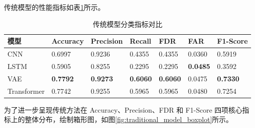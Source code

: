 \documentclass[bachelor, vlined]{DissertUESTC}
\begin{document}
    传统模型的性能指标如表\ref{tab:baseline_metrics}所示。
    
    \begin{table}[!htbp]
      \caption{传统模型分类指标对比}
      \label{tab:baseline_metrics}
      \begin{tabular}{p{2.2cm} p{1.6cm} p{1.6cm} p{1.6cm} p{1.6cm} p{1.6cm} p{1.6cm}}
          \toprule
          \textbf{模型} & \textbf{Accuracy} & \textbf{Precision} & \textbf{Recall} & \textbf{FDR} &
  \textbf{FAR} & \textbf{F1-Score} \\
          \midrule
          CNN         & 0.6997 & 0.9236 & 0.4355 & 0.4355 & 0.0360 & 0.5919 \\
          LSTM        & 0.5905 & 0.8255 & 0.2295 & 0.2295 & \textbf{0.0485} & 0.3592 \\
          VAE         & \textbf{0.7792} & \textbf{0.9273} & \textbf{0.6060} & \textbf{0.6060} & 0.0475 & \textbf{0.7330} \\
          Transformer & 0.7742 & 0.9255 & 0.5965 & 0.5965 & 0.0480 & 0.7254 \\
          \bottomrule
      \end{tabular}
    \end{table}

    为了进一步呈现传统方法在 Accuracy、Precision、FDR 和 F1-Score 四项核心指标上的整体分布，绘制箱形图，如图\ref{fig:traditional_model_boxplot}所示。
\end{document}
